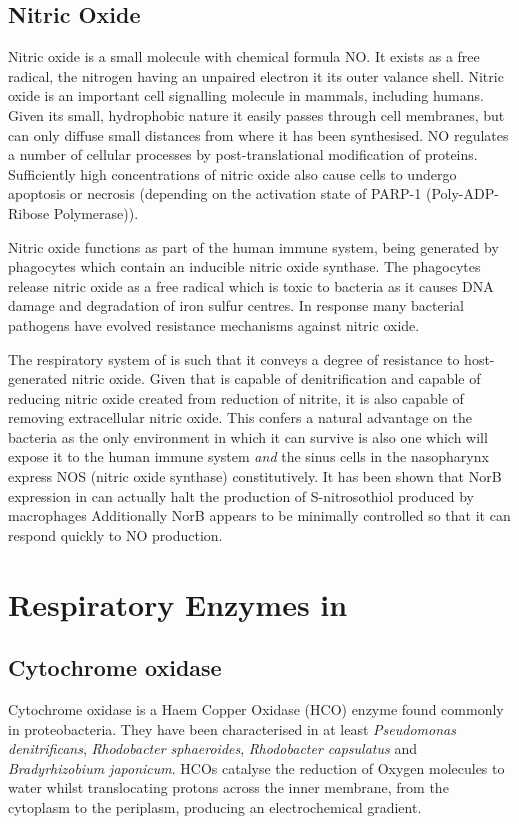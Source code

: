 \subsection{Nitric Oxide}
Nitric oxide is a small molecule with chemical formula NO. It exists as a free radical, the nitrogen having an unpaired electron it its outer valance shell. Nitric oxide is an important cell signalling molecule in mammals, including humans\cite{Blaise2005}. Given its small, hydrophobic nature it easily passes through cell membranes, but can only diffuse small distances from where it has been synthesised. NO regulates a number of cellular processes by post-translational modification of proteins. Sufficiently high concentrations of nitric oxide also cause cells to undergo apoptosis or necrosis (depending on the activation state of PARP-1 (Poly-ADP-Ribose Polymerase))\cite{Blaise2005}.

Nitric oxide functions as part of the human immune system, being generated by phagocytes which contain an inducible nitric oxide synthase. The phagocytes release nitric oxide as a free radical which is toxic to bacteria as it causes DNA damage\cite{Wink1991} and degradation of iron sulfur centres\cite{Hibbs1988,Jones-Carson2012}. In response many bacterial pathogens have evolved resistance mechanisms against nitric oxide\cite{Moir2011,Privett2012}.

The respiratory system of \Nsm{} is such that it conveys a degree of resistance to host-generated nitric oxide. Given that \Nm{} is capable of denitrification and capable of reducing nitric oxide created from reduction of nitrite, it is also capable of removing extracellular nitric oxide. This confers a natural  advantage on the bacteria as the only environment in which it can survive is also one which will expose it to the human immune system \textit{and} the sinus cells in the nasopharynx express NOS (nitric oxide synthase)\cite{Thomson2008} constitutively. It has been shown that NorB expression in \Nm{} can actually halt the production of S-nitrosothiol produced by macrophages\cite{Laver2010} Additionally NorB appears to be minimally controlled so that it can respond quickly to NO production\cite{Thomson2008}.

\section{Respiratory Enzymes in \Nm{}}
\subsection{\texorpdfstring{Cytochrome \cbbthree{} oxidase}{Cytochrome cbb3 oxidase}}
Cytochrome \cbbthree{} oxidase is a Haem Copper Oxidase (HCO) enzyme found commonly in proteobacteria. They have been characterised in at least \textit{Pseudomonas denitrificans}, \textit{Rhodobacter sphaeroides}, \textit{Rhodobacter capsulatus} and \textit{Bradyrhizobium japonicum}\cite{Pitcher2004}. HCOs catalyse the reduction of Oxygen molecules to water whilst translocating protons across the inner membrane, from the cytoplasm to the periplasm, producing an electrochemical gradient.

